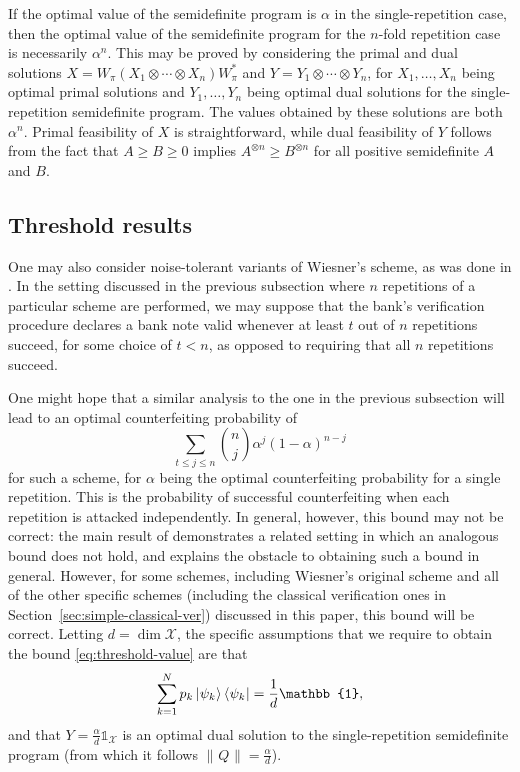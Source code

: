 \documentclass[11pt,letterpaper]{article}
\theoremstyle{definition}
\newcommand{\tinyspace}{\mspace{1mu}}
\newcommand{\microspace}{\mspace{0.5mu}}
\newcommand{\norm}[1]{\left\lVert\tinyspace#1\tinyspace\right\rVert}
\def\I{\mathbb{1}}
\def \lket {\left|}
\def \rket {\right\rangle}
\def \lbra {\left\langle}
\def \rbra {\right|}
\newcommand{\ket}[1]{\lket\microspace #1 \microspace\rket}
\newcommand{\bra}[1]{\lbra\microspace #1 \microspace\rbra}
\def\X{\mathcal{X}}
\begin{document}
If the optimal value of the semidefinite program is $\alpha$ in the
single-repetition case, then the optimal value of the semidefinite
program for the $n$-fold repetition case is necessarily $\alpha^n$.
This may be proved by considering the primal and dual solutions
$X = W_{\pi}(X_1\otimes\cdots\otimes X_n)W_{\pi}^{\ast}$
and $Y = Y_1\otimes\cdots\otimes Y_n$, for $X_1,\ldots,X_n$ being
optimal primal solutions and $Y_1,\ldots,Y_n$ being optimal dual
solutions for the single-repetition semidefinite program.
The values obtained by these solutions are both $\alpha^n$.
Primal feasibility of $X$ is straightforward, while dual feasibility
of $Y$ follows from the fact that $A \geq B \geq 0$ implies
$A^{\otimes n}\geq B^{\otimes n}$ for all positive semidefinite $A$
and $B$.

\subsection{Threshold results}
 \label{sec:threshold}

One may also consider noise-tolerant variants of Wiesner's 
scheme, as was done in \cite{PYJLC11}.
In the setting discussed in the previous subsection
where $n$ repetitions of a particular scheme are performed, we may
suppose that the bank's verification procedure declares a bank note
valid whenever at least $t$ out of $n$ repetitions succeed, for some
choice of $t<n$, as opposed to requiring that all $n$ repetitions
succeed.  

One might hope that a similar analysis to the one in the previous
subsection will lead to an optimal counterfeiting probability of
\begin{equation} \label{eq:threshold-value}
\sum_{t\leq j\leq n}
\binom{n}{j}\alpha^j(1-\alpha)^{n-j}
\end{equation}
for such a scheme, for $\alpha$ being the optimal counterfeiting
probability for a single repetition.
This is the probability of successful counterfeiting when each
repetition is attacked independently.
In general, however, this bound may not be correct: the main result of
\cite{MolinaW11} demonstrates a related setting in which an analogous
bound does not hold, and explains the obstacle to obtaining such a
bound in general.
However, for some schemes, including Wiesner's original scheme and all
of the other specific schemes (including the classical verification ones in 
Section~\ref{sec:simple-classical-ver}) discussed in this paper, this bound will
be correct.
Letting $d = \dim{\X}$, the specific assumptions that we require to
obtain the bound \eqref{eq:threshold-value} are that
\begin{equation} \label{eq:ensemble-state}
  \sum_{k=1}^N p_k \ket{\psi_k}\bra{\psi_k} = \frac{1}{d}\I,
\end{equation} 
and that $Y = \frac{\alpha}{d} \I_{\X}$ is an optimal dual solution to
the single-repetition semidefinite program (from which it follows
$\norm{Q}= \frac{\alpha}{d}$).
\end{document}
